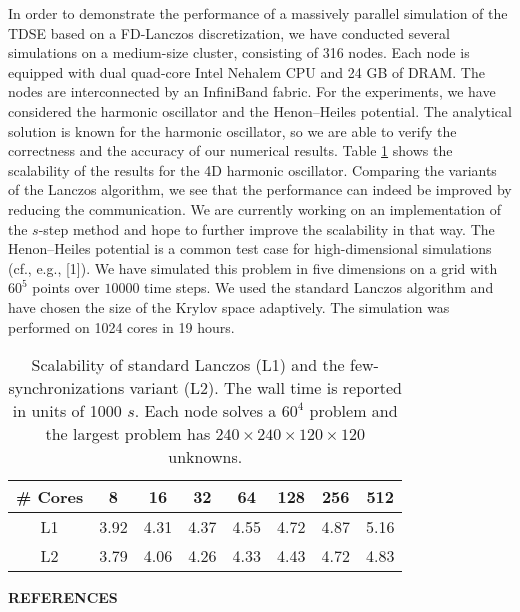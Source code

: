 \documentclass{report}
\begin{document}
In order to demonstrate the performance of a massively parallel
simulation of the TDSE based on a FD-Lanczos discretization, we have
conducted several simulations on a medium-size cluster, consisting of 316
nodes. Each node is equipped with dual quad-core Intel Nehalem CPU and 24
GB of DRAM. The nodes are interconnected by an InfiniBand fabric. For the
experiments, we have considered the harmonic oscillator and the
Henon--Heiles potential. The analytical solution is known for the
harmonic oscillator, so we are able to verify the correctness and the
accuracy of our numerical results. Table \ref{tab:1} shows the
scalability of the results for the 4D harmonic oscillator. Comparing the
variants of the Lanczos algorithm, we see that the performance can indeed
be improved by reducing the communication. We are currently working on an
implementation of the $s$-step method and hope to further improve the
scalability in that way. The Henon--Heiles potential is a common test
case for high-dimensional simulations (cf., e.g., [1]). We have simulated
this problem in five dimensions on a grid with $60^5$ points over $10000$
time steps. We used the standard Lanczos algorithm and have chosen the
size of the Krylov space adaptively. The simulation was performed on 1024
cores in 19 hours.

\begin{table}[htdp]
\caption{\footnotesize{Scalability of standard Lanczos (L1) and the
few-synchronizations variant (L2). The wall time is reported in units of
1000 $s$. Each node solves a $60^{4}$ problem and the largest problem has
$240 \times 240 \times 120 \times 120$ unknowns.}}
\begin{center}
\begin{tabular}{|c|c|c|c|c|c|c|c|}
\hline
\# Cores & 8 & 16 & 32 & 64 & 128 & 256 & 512 \\
\hline
L1& 3.92& 4.31& 4.37& 4.55& 4.72& 4.87& 5.16 \\
L2& 3.79& 4.06& 4.26& 4.33& 4.43& 4.72& 4.83 \\
\hline
\end{tabular}
\end{center}
\label{tab:1}
\end{table}%


\begin{center}
{\bf REFERENCES}\\[-3mm]
\end{center}
\end{document}
